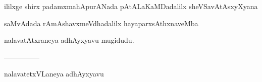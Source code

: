\documentclass{article}
\begin{document}
\begin{center}
ililxge shirx padamxmahApurANada pAtALaKaMDadalilx sheVSavAtAsxyXyana
\end{center}

\begin{center}
saMvAdada rAmAshavxmeVdhadalilx hayaparxsAthxnaveMba
\end{center}

\begin{center}
nalavatAtxraneya adhAyxyavu mugidudu.
\end{center}

\begin{center}
---------------
\end{center}

\begin{center}
nalavatetxVLaneya adhAyxyavu
\end{center}
\end{document}
